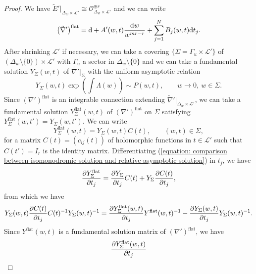 \documentclass[pdftex]{sigma}
\numberwithin{equation}{section}
\begin{document}
\begin{proof}
We have
$\tilde{E}'|_{\Delta_w\times{\mathcal L'}}\cong{\mathcal O}_{\Delta_w\times{\mathcal L'}}^{\oplus r}$
and we can write
\[
 \big(\tilde{\nabla}'\big)^{\rm flat}
 =
 {\rm d}+ A'(w,t)\frac{{\rm d}w}{w^{mr-r}} +\sum_{j=1}^N B_j(w,t) {\rm d}t_j .
\]
After shrinking ${\mathcal L'}$ if necessary,
we can take a covering
$\{\Sigma=\Gamma_u\times{\mathcal L'}\}$ of $(\Delta_w\setminus\{0\})\times{\mathcal L'}$
with $\Gamma_u$ a sector in $\Delta_w\setminus\{0\}$ and
we can take a fundamental solution
$Y_{\Sigma}(w,t)$ of $\tilde{\nabla'}|_{\Sigma}$
with the uniform asymptotic relation
\begin{equation} \label{equation: family of asymptotic relation}
 Y_{\Sigma}(w,t)
 \exp\left(\int\Lambda(w)\right)
 \sim P(w,t),
 \qquad
 w\to 0, \ w\in\Sigma.
\end{equation}
Since $(\nabla')^{\mathrm{flat}}$ is an integrable connection
extending $\tilde{\nabla}'|_{\Delta_w\times{\mathcal L'}}$,
we can take a fundamental solution
$Y^{\mathrm{flat}}_{\Sigma}(w,t)$ of $(\nabla')^{\mathrm{flat}}$
on $\Sigma$
satisfying
$Y^{\mathrm{flat}}_{\Sigma}(w,t')=Y_{\Sigma}(w,t')$.
We can write
\begin{equation}
\label{equation: comparison between isomonodromic solution and relative asymptotic solution}
 Y^{\mathrm{flat}}_{\Sigma}(w,t)
 =
 Y_{\Sigma}(w,t)
 C(t),
 \qquad
 (w,t)\in \Sigma,
\end{equation}
for a matrix $C(t)=(c_{ij}(t))$ of holomorphic functions in $t\in {\mathcal L'}$ such that
$C(t')=I_r$ is the identity matrix.
Differentiating
(\ref{equation: comparison between isomonodromic solution and relative asymptotic solution})
in $t_j$, we have
\[
 \frac{\partial Y^{\rm flat}_{\Sigma}} {\partial t_j}
 =\frac{\partial Y_{\Sigma}} {\partial t_j} C(t)
 + Y_{\Sigma} \frac{\partial C(t)} {\partial t_j},
 \]
from which we have
\begin{gather} \label{equation: difference of dt-coefficient with asymptotic}
 Y_{\Sigma}(w,t) \frac{\partial C(t)} {\partial t_j}
 C(t)^{-1} Y_{\Sigma}(w,t)^{-1}
 =
 \frac{\partial Y^{\rm flat}_{\Sigma}(w,t)} {\partial t_j} Y^{\mathrm{flat}}(w,t)^{-1}
 -\frac{\partial Y_{\Sigma}(w,t)} {\partial t_j} Y_{\Sigma}(w,t)^{-1}.
\end{gather}
Since $Y^{\mathrm{flat}}(w,t)$ is a fundamental solution matrix of
$(\nabla')^{\mathrm{flat}}$, we have
\begin{equation} \label{equation: integrability induce meromorphic}
 \frac{\partial Y^{\rm flat}_{\Sigma}(w,t)} {\partial t_j}

\end{equation}
\end{proof}
\end{document}
